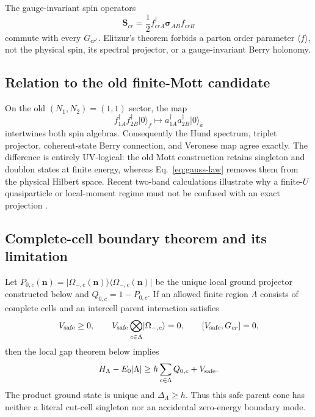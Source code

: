 \documentclass[11pt]{article}
\theoremstyle{definition}
\theoremstyle{remark}
\newcommand{\ket}[1]{\lvert #1\rangle}
\newcommand{\bra}[1]{\langle #1\rvert}
\begin{document}
The gauge-invariant spin operators
\begin{equation}
 \bm S_{cr}=\frac12f_{crA}^\dagger\bm\sigma_{AB}f_{crB}
 \label{eq:spin-operator}
\end{equation}
commute with every \(G_{cr'}\).  Elitzur's theorem forbids a parton order
parameter \(\langle f\rangle\), not the physical spin, its spectral projector,
or a gauge-invariant Berry holonomy.

\subsection{Relation to the old finite-Mott candidate}

On the old \((N_1,N_2)=(1,1)\) sector, the map
\begin{equation}
 f_{1A}^\dagger f_{2B}^\dagger\ket0_f
 \longmapsto
 a_{1A}^\dagger a_{2B}^\dagger\ket0_a
 \label{eq:sector-isomorphism}
\end{equation}
intertwines both spin algebras.  Consequently the Hund spectrum, triplet
projector, coherent-state Berry connection, and Veronese map agree exactly.
The difference is entirely UV-logical: the old Mott construction retains
singleton and doublon states at finite energy, whereas
Eq.~\eqref{eq:gauss-law} removes them from the physical Hilbert space.
Recent two-band calculations illustrate why a finite-\(U\) quasiparticle or
local-moment regime must not be confused with an exact projection
\cite{MazitovKatanin2024}.

\subsection{Complete-cell boundary theorem and its limitation}

Let \(P_{0,c}(\bm n)=
\ket{\Omega_{-,c}(\bm n)}\!\bra{\Omega_{-,c}(\bm n)}\) be the unique local
ground projector constructed below and \(Q_{0,c}=1-P_{0,c}\).  If an allowed
finite region \(\Lambda\) consists of complete
cells and an intercell parent interaction satisfies
\begin{equation}
 V_{\rm safe}\ge0,\qquad
 V_{\rm safe}\bigotimes_{c\in\Lambda}\ket{\Omega_{-,c}}=0,
 \qquad [V_{\rm safe},G_{cr}]=0,
 \label{eq:safe-parent}
\end{equation}
then the local gap theorem below implies
\begin{equation}
 H_\Lambda-E_0|\Lambda|
 \ge h\sum_{c\in\Lambda}Q_{0,c}+V_{\rm safe}.
 \label{eq:parent-gap}
\end{equation}
The product ground state is unique and \(\Delta_\Lambda\ge h\).  Thus this
safe parent cone has neither a literal cut-cell singleton nor an accidental
zero-energy boundary mode.
\end{document}
